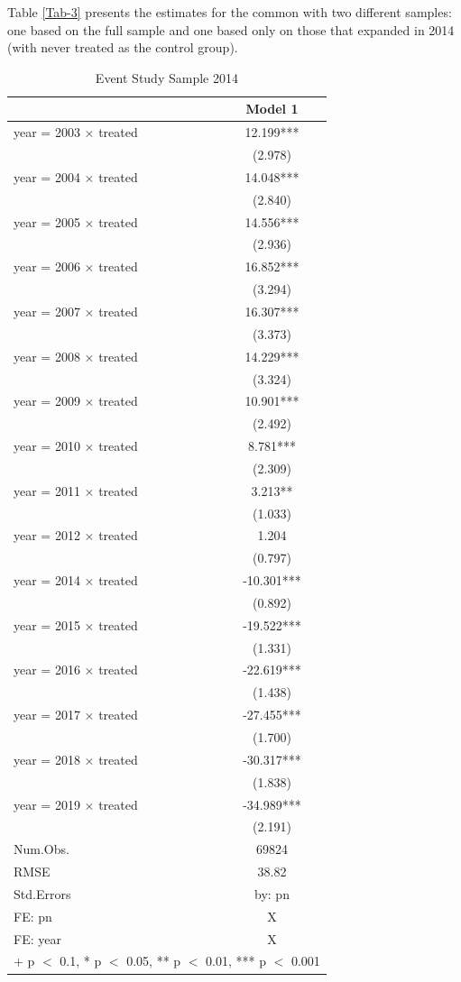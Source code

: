 \documentclass[
  12pt,
]{article}
\begin{document}
Table \ref{Tab-3} presents the estimates for the common with two
different samples: one based on the full sample and one based only on
those that expanded in 2014 (with never treated as the control group).

\begin{table}

\caption{\label{tab:Tab-3}Event Study Sample 2014}
\centering
\begin{tabular}[t]{lc}
\toprule
  & Model 1\\
\midrule
year = 2003 × treated & 12.199***\\
 & (2.978)\\
year = 2004 × treated & 14.048***\\
 & (2.840)\\
year = 2005 × treated & 14.556***\\
 & (2.936)\\
year = 2006 × treated & 16.852***\\
 & (3.294)\\
year = 2007 × treated & 16.307***\\
 & (3.373)\\
year = 2008 × treated & 14.229***\\
 & (3.324)\\
year = 2009 × treated & 10.901***\\
 & (2.492)\\
year = 2010 × treated & 8.781***\\
 & (2.309)\\
year = 2011 × treated & 3.213**\\
 & (1.033)\\
year = 2012 × treated & 1.204\\
 & (0.797)\\
year = 2014 × treated & -10.301***\\
 & (0.892)\\
year = 2015 × treated & -19.522***\\
 & (1.331)\\
year = 2016 × treated & -22.619***\\
 & (1.438)\\
year = 2017 × treated & -27.455***\\
 & (1.700)\\
year = 2018 × treated & -30.317***\\
 & (1.838)\\
year = 2019 × treated & -34.989***\\
 & (2.191)\\
\midrule
Num.Obs. & 69824\\
RMSE & 38.82\\
Std.Errors & by: pn\\
FE: pn & X\\
FE: year & X\\
\bottomrule
\multicolumn{2}{l}{\rule{0pt}{1em}+ p $<$ 0.1, * p $<$ 0.05, ** p $<$ 0.01, *** p $<$ 0.001}\\
\end{tabular}
\end{table}
\end{document}
